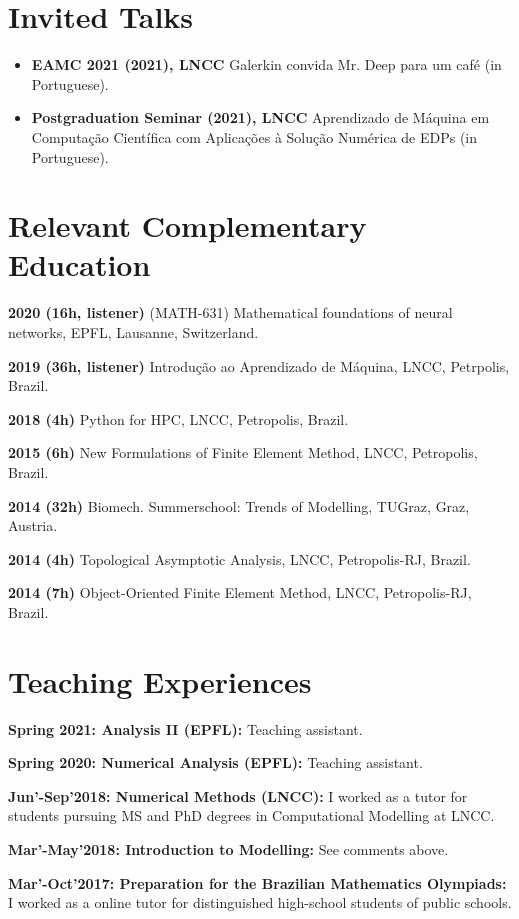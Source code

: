 \documentclass[letterpaper]{twentysecondcv} %
\begin{document}
\section{Invited Talks}
\begin{itemize}
\item \textbf{EAMC 2021 (2021), LNCC} Galerkin convida Mr. Deep para um café (in Portuguese).
\item \textbf{Postgraduation Seminar (2021), LNCC} Aprendizado de Máquina em Computação Científica com Aplicações à Solução Numérica de EDPs (in Portuguese).
\end{itemize}

\section{Relevant Complementary Education}
\item \textbf{2020 (16h, listener)} (MATH-631) Mathematical foundations of neural networks, EPFL, Lausanne, Switzerland.
\item \textbf{2019 (36h, listener)} Introdução ao Aprendizado de Máquina, LNCC, Petrpolis, Brazil.
\item \textbf{2018 (4h)} Python for HPC, LNCC, Petropolis, Brazil.
\item \textbf{2015 (6h) } New Formulations of Finite Element Method, LNCC, Petropolis, Brazil.
\item \textbf{2014 (32h) } Biomech. Summerschool: Trends of Modelling, TUGraz, Graz, Austria.
\item \textbf{2014 (4h) } Topological Asymptotic Analysis, LNCC, Petropolis-RJ, Brazil. 
\item \textbf{2014 (7h) } Object-Oriented Finite Element Method, LNCC, Petropolis-RJ, Brazil.

\section{Teaching Experiences}
\item \textbf{Spring 2021: Analysis II (EPFL):} Teaching assistant.
\item \textbf{Spring 2020: Numerical Analysis (EPFL):} Teaching assistant.
\item \textbf{Jun'-Sep'2018: Numerical Methods (LNCC):} I worked as a tutor for students pursuing MS and PhD degrees in Computational Modelling at LNCC.
\item \textbf{Mar'-May'2018: Introduction to Modelling:} See comments above.
\item \textbf{Mar'-Oct'2017: Preparation for the Brazilian Mathematics Olympiads:} I worked as a online tutor for distinguished high-school students of public schools.
\end{document}
